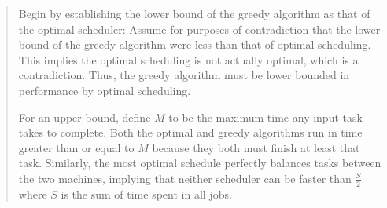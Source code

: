 \documentclass[11pt]{article}
\begin{document}
\begin{enumerate}
\begin{enumerate}
\begin{quote}
  \medskip
Begin by establishing the lower bound of the greedy algorithm as that of the optimal scheduler: Assume for purposes of contradiction that the lower bound of the greedy algorithm were less than that of optimal scheduling. This implies the optimal scheduling is not actually optimal, which is a contradiction. Thus, the greedy algorithm must be lower bounded in performance by optimal scheduling. 

\medskip
For an upper bound, define $M$ to be the maximum time any input task takes to complete. Both the optimal and greedy algorithms run in time greater than or equal to $M$ because they both must finish at least that task. Similarly, the most optimal schedule perfectly balances tasks between the two machines, implying that neither scheduler can be faster than $\frac{S}{2}$ where $S$ is the sum of time spent in all jobs.


\end{quote}
\end{enumerate}
\end{enumerate}
\end{document}
